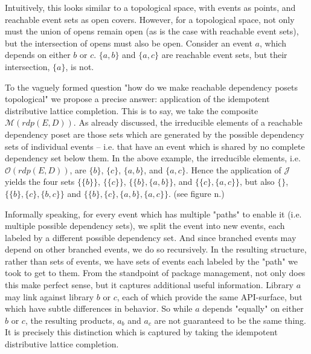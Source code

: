 \documentclass[hoptionsi,review,format=sigplan]{acmart}
\theoremstyle{definition}
\newcommand{\Mcc}{\mathcal{M}}
\newcommand{\Oc}{\mathcal{O}}
\newcommand{\Jc}{\mathcal{J}}
\begin{document}
Intuitively, this looks similar to a topological space, with events as points, and reachable event sets as open covers. However, for a topological space, not only must the union of opens remain open (as is the case with reachable event sets), but the intersection of opens must also be open. Consider an event \(a\), which depends on either \(b\) or \(c\). \(\{a,b\}\) and  \(\{a,c\}\) are reachable event sets, but their intersection, \(\{a\}\), is not.

To the vaguely formed question "how do we make reachable dependency posets topological" we propose a precise answer: application of the idempotent distributive lattice completion. This is to say, we take the composite \(\Mcc(rdp(E,D))\). As already discussed, the irreducible elements of a reachable dependency poset are those sets which are generated by the possible dependency sets of individual events -- i.e. that have an event which is shared by no complete dependency set below them. In the above example, the irreducible elements, i.e. \(\Oc(rdp(E,D))\), are \(\{b\}\), \(\{c\}\), \(\{a,b\}\), and \(\{a,c\}\). Hence the application of \(\Jc\) yields the four sets \(\{\{b\}\}\), \(\{\{c\}\}\), \(\{\{b\},\{a,b\}\}\), and \(\{\{c\},\{a,c\}\}\), but also \(\{\}\), \(\{\{b\},\{c\},\{b,c\}\}\) and \(\{\{b\},\{c\},\{a,b\},\{a,c\}\}\). (see figure n.)




Informally speaking, for every event which has multiple "paths" to enable it (i.e. multiple possible dependency sets), we split the event into new events, each labeled by a different possible dependency set. And since branched events may depend on other branched events, we do so recursively. In the resulting structure, rather than sets of events, we have sets of events each labeled by the "path" we took to get to them. From the standpoint of package management, not only does this make perfect sense, but it captures additional useful information. Library \(a\) may link against library \(b\) or \(c\), each of which provide the same API-surface, but which have subtle differences in behavior. So while \(a\) depends "equally" on either \(b\) or \(c\), the resulting products, \(a_b\) and \(a_c\) are not guaranteed to be the same thing. It is precisely this distinction which is captured by taking the idempotent distributive lattice completion.
\end{document}
